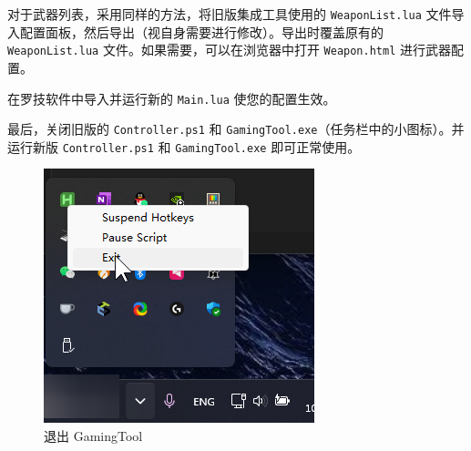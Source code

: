对于武器列表，采用同样的方法，将旧版集成工具使用的 \lstinline{WeaponList.lua} 文件导入配置面板，然后导出（视自身需要进行修改）。导出时覆盖原有的 \lstinline{WeaponList.lua} 文件。如果需要，可以在浏览器中打开 \lstinline{Weapon.html} 进行武器配置。

在罗技软件中导入并运行新的 \lstinline{Main.lua} 使您的配置生效。

最后，关闭旧版的 \lstinline{Controller.ps1} 和 \lstinline{GamingTool.exe}（任务栏中的小图标）。并运行新版 \lstinline{Controller.ps1} 和 \lstinline{GamingTool.exe} 即可正常使用。

\begin{figure}[H]
    \Centering
    \includegraphics[width=\textwidth]{documents/assets/intro/exit_gamingtool}
    \caption{退出 GamingTool}
\end{figure}